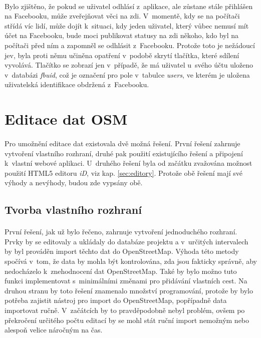 \documentclass[11pt,a4paper,titlepage,oneside]{book}
\begin{document}
				\paragraph{} Bylo zjištěno, že pokud se uživatel odhlásí z~aplikace, ale zůstane stále přihlášen na Facebooku, může zveřejňovat věci na zdi. V~momentě, kdy se na počítači střídá víc lidí, může dojít k~situaci, kdy jeden uživatel, který vůbec nemusí mít účet na Facebooku, bude moci publikovat statusy na zdi někoho, kdo byl na počítači před ním a zapomněl se odhlásit z~Facebooku. Protože toto je nežádoucí jev, byla proti němu učiněna opatření v~podobě skrytí tlačítka, které sdílení vyvolává. Tlačítko se zobrazí jen v~případě, že má uživatel u~svého účtu uloženo v~databázi \textit{fbuid}, což je označení pro pole v~tabulce \textit{users}, ve kterém je uložena uživatelská identifikace obdržená z~Facebooku.
		

		\section{Editace dat OSM}



				\paragraph{} Pro umožnění editace dat existovala dvě možná řešení. První řešení zahrnuje vytvoření vlastního rozhraní, druhé pak použití existujícího řešení a připojení k~vlastní webové aplikaci. U~druhého řešení byla od začátku zvažována možnost použití HTML5 editoru \textit{iD}, viz kap. \ref{sec:editory}. Protože obě řešení mají své výhody a nevýhody, budou zde vypsány obě.
			\subsection{Tvorba vlastního rozhraní}
				\paragraph{} První řešení, jak už bylo řečeno, zahrnuje vytvoření jednoduchého rozhraní. Prvky by se editovaly a  ukládaly do databáze projektu a v~určitých intervalech by byl prováděn import těchto dat do OpenStreetMap. Výhoda této metody spočívá v~tom, že data by mohla být kontrolována, zda jsou fakticky správně, aby nedocházelo k~znehodnocení dat OpenStreetMap. Také by bylo možno tuto funkci implementovat s~minimálními změnami pro přidávání vlastních cest. Na druhou stranu by toto řešení znamenalo množství programování, protože by bylo potřeba zajistit nástroj pro import do OpenStreetMap, popřípadně data importovat ručně. V~začátcích by to pravdě\-podobně nebyl problém, ovšem po překročení určitého počtu editací by se mohl stát ruční import nemožným nebo alespoň velice náročným na čas.
\end{document}
